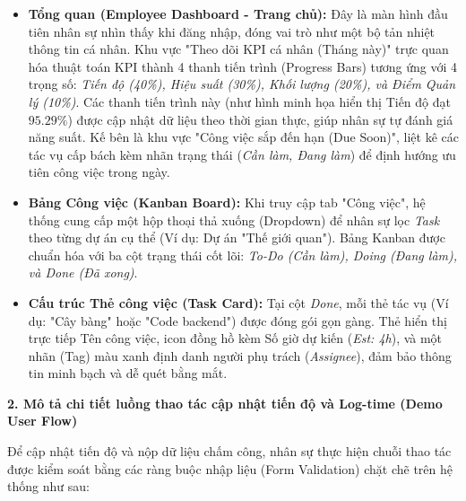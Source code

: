 \documentclass[a4paper,13.5pt]{extreport}
\begin{document}
\begin{itemize}
    \item \textbf{Tổng quan (Employee Dashboard - Trang chủ):} Đây là màn hình đầu tiên nhân sự nhìn thấy khi đăng nhập, đóng vai trò như một bộ tản nhiệt thông tin cá nhân. Khu vực "Theo dõi KPI cá nhân (Tháng này)" trực quan hóa thuật toán KPI thành 4 thanh tiến trình (Progress Bars) tương ứng với 4 trọng số: \textit{Tiến độ (40\%), Hiệu suất (30\%), Khối lượng (20\%), và Điểm Quản lý (10\%)}. Các thanh tiến trình này (như hình minh họa hiển thị Tiến độ đạt $95.29\%$) được cập nhật dữ liệu theo thời gian thực, giúp nhân sự tự đánh giá năng suất. Kế bên là khu vực "Công việc sắp đến hạn (Due Soon)", liệt kê các tác vụ cấp bách kèm nhãn trạng thái (\textit{Cần làm, Đang làm}) để định hướng ưu tiên công việc trong ngày.
    
    \item \textbf{Bảng Công việc (Kanban Board):} Khi truy cập tab "Công việc", hệ thống cung cấp một hộp thoại thả xuống (Dropdown) để nhân sự lọc \textit{Task} theo từng dự án cụ thể (Ví dụ: Dự án "Thế giới quan"). Bảng Kanban được chuẩn hóa với ba cột trạng thái cốt lõi: \textit{To-Do (Cần làm), Doing (Đang làm), và Done (Đã xong)}.
    
    \item \textbf{Cấu trúc Thẻ công việc (Task Card):} Tại cột \textit{Done}, mỗi thẻ tác vụ (Ví dụ: "Cây bàng" hoặc "Code backend") được đóng gói gọn gàng. Thẻ hiển thị trực tiếp Tên công việc, icon đồng hồ kèm Số giờ dự kiến (\textit{Est: 4h}), và một nhãn (Tag) màu xanh định danh người phụ trách (\textit{Assignee}), đảm bảo thông tin minh bạch và dễ quét bằng mắt.
\end{itemize}

\textbf{2. Mô tả chi tiết luồng thao tác cập nhật tiến độ và Log-time (Demo User Flow)}

Để cập nhật tiến độ và nộp dữ liệu chấm công, nhân sự thực hiện chuỗi thao tác được kiểm soát bằng các ràng buộc nhập liệu (Form Validation) chặt chẽ trên hệ thống như sau:
\end{document}
